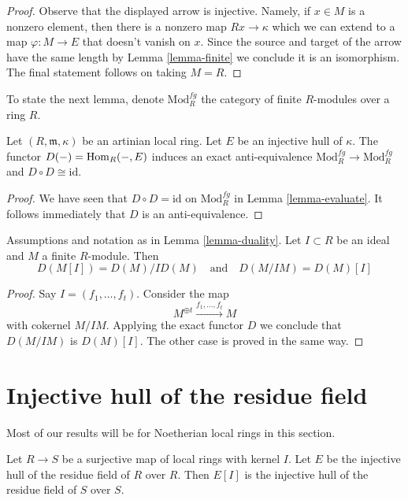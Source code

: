 \begin{proof}
Observe that the displayed arrow is injective. Namely, if $x \in M$ is
a nonzero element, then there is a nonzero map $Rx \to \kappa$ which
we can extend to a map $\varphi : M \to E$ that doesn't vanish on $x$.
Since the source and target of the arrow have the same length by
Lemma \ref{lemma-finite}
we conclude it is an isomorphism. The final statement follows
on taking $M = R$.
\end{proof}

\noindent
To state the next lemma, denote $\text{Mod}^{fg}_R$ the category of finite
$R$-modules over a ring $R$.

\begin{lemma}
\label{lemma-duality}
Let $(R, \mathfrak m, \kappa)$ be an artinian local ring.
Let $E$ be an injective hull of $\kappa$.
The functor $D(-) = \mathop{\mathrm{Hom}}\nolimits_R(-, E)$ induces an exact anti-equivalence
$\text{Mod}^{fg}_R \to \text{Mod}^{fg}_R$ and
$D \circ D \cong \text{id}$.
\end{lemma}

\begin{proof}
We have seen that $D \circ D = \text{id}$ on $\text{Mod}^{fg}_R$
in Lemma \ref{lemma-evaluate}. It follows immediately that
$D$ is an anti-equivalence.
\end{proof}

\begin{lemma}
\label{lemma-duality-torsion-cotorsion}
Assumptions and notation as in Lemma \ref{lemma-duality}.
Let $I \subset R$ be an ideal and $M$ a finite $R$-module.
Then
$$
D(M[I]) = D(M)/ID(M) \quad\text{and}\quad D(M/IM) = D(M)[I]
$$
\end{lemma}

\begin{proof}
Say $I = (f_1, \ldots, f_t)$. Consider the map
$$
M^{\oplus t} \xrightarrow{f_1, \ldots, f_t} M
$$
with cokernel $M/IM$. Applying the exact functor $D$ we conclude that
$D(M/IM)$ is $D(M)[I]$. The other case is proved in the same way.
\end{proof}



\section{Injective hull of the residue field}
\label{section-hull-residue-field}

\noindent
Most of our results will be for Noetherian local rings in this section.

\begin{lemma}
\label{lemma-quotient}
Let $R \to S$ be a surjective map of local rings with kernel $I$.
Let $E$ be the injective hull of the residue field of $R$ over $R$.
Then $E[I]$ is the injective hull of the residue field of $S$ over $S$.
\end{lemma}

